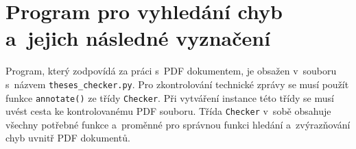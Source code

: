 \dummyText



\section{Program pro vyhledání chyb a~jejich následné vyznačení} \label{checker}
Program, který zodpovídá za práci s~PDF dokumentem, je obsažen v~souboru s~názvem
\texttt{theses\_checker.py}. Pro zkontrolování technické zprávy se musí použít
funkce \texttt{annotate()} ze třídy \texttt{Checker}. Při vytváření instance této
třídy se musí uvést cesta ke kontrolovanému PDF souboru. Třída \texttt{Checker}
v~sobě obsahuje všechny potřebné funkce a~proměnné pro správnou funkci hledání
a~zvýrazňování chyb uvnitř PDF dokumentů.

